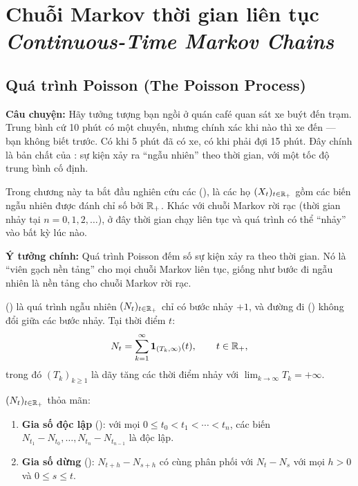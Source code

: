 \chapter{Chuỗi Markov thời gian liên tục\\{\normalsize\textit{Continuous-Time Markov Chains}}}
\label{ch:continuous}

\section{Quá trình Poisson (The Poisson Process)}
\label{sec:poisson}

\textbf{Câu chuyện:} Hãy tưởng tượng bạn ngồi ở quán café quan sát xe buýt đến trạm.
Trung bình cứ 10 phút có một chuyến, nhưng chính xác khi nào thì xe đến --- bạn không biết trước.
Có khi 5 phút đã có xe, có khi phải đợi 15 phút. Đây chính là bản chất của :
sự kiện xảy ra ``ngẫu nhiên'' theo thời gian, với một tốc độ trung bình cố định.

Trong chương này ta bắt đầu nghiên cứu các  (),
là các họ $(X_t)_{t\in\mathbb{R}_+}$ gồm các biến ngẫu nhiên được đánh chỉ số bởi $\mathbb{R}_+$.
Khác với chuỗi Markov rời rạc (thời gian nhảy tại $n = 0, 1, 2, \ldots$),
ở đây thời gian chạy liên tục và quá trình có thể ``nhảy'' vào bất kỳ lúc nào.

\begin{tomtat}
\textbf{Ý tưởng chính:} Quá trình Poisson đếm số sự kiện xảy ra theo thời gian.
Nó là ``viên gạch nền tảng'' cho mọi chuỗi Markov liên tục,
giống như bước đi ngẫu nhiên là nền tảng cho chuỗi Markov rời rạc.
\end{tomtat}

\begin{dinhnghia}
 () là quá trình ngẫu nhiên $(N_t)_{t\in\mathbb{R}_+}$ chỉ có bước nhảy $+1$, và đường đi () không đổi giữa các bước nhảy. Tại thời điểm $t$:
\[
  N_t = \sum_{k=1}^{\infty} \mathbf{1}_{(T_k, \infty)}(t), \qquad t \in \mathbb{R}_+,
\]
trong đó $(T_k)_{k\geq 1}$ là dãy tăng các thời điểm nhảy với $\lim_{k\to\infty} T_k = +\infty$.

$(N_t)_{t\in\mathbb{R}_+}$ thỏa mãn:
\begin{enumerate}[nosep]
  \item \textbf{Gia số độc lập} (): với mọi $0 \leq t_0 < t_1 < \cdots < t_n$, các biến $N_{t_1} - N_{t_0}, \ldots, N_{t_n} - N_{t_{n-1}}$ là độc lập.
  \item \textbf{Gia số dừng} (): $N_{t+h} - N_{s+h}$ có cùng phân phối với $N_t - N_s$ với mọi $h > 0$ và $0 \leq s \leq t$.
\end{enumerate}
\end{dinhnghia}


